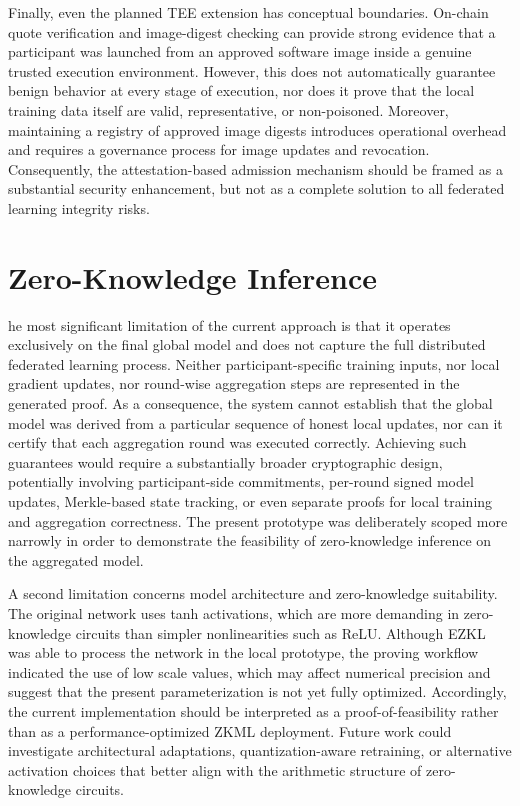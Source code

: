 Finally, even the planned TEE extension has conceptual boundaries. On-chain quote verification and image-digest checking can provide strong evidence that a participant was launched from an approved software image inside a genuine trusted execution environment. However, this does not automatically guarantee benign behavior at every stage of execution, nor does it prove that the local training data itself are valid, representative, or non-poisoned. Moreover, maintaining a registry of approved image digests introduces operational overhead and requires a governance process for image updates and revocation. Consequently, the attestation-based admission mechanism should be framed as a substantial security enhancement, but not as a complete solution to all federated learning integrity risks.

\section{Zero-Knowledge Inference}

he most significant limitation of the current approach is that it operates exclusively on the final global model and does not capture the full distributed federated learning process. Neither participant-specific training inputs, nor local gradient updates, nor round-wise aggregation steps are represented in the generated proof. As a consequence, the system cannot establish that the global model was derived from a particular sequence of honest local updates, nor can it certify that each aggregation round was executed correctly. Achieving such guarantees would require a substantially broader cryptographic design, potentially involving participant-side commitments, per-round signed model updates, Merkle-based state tracking, or even separate proofs for local training and aggregation correctness. The present prototype was deliberately scoped more narrowly in order to demonstrate the feasibility of zero-knowledge inference on the aggregated model.

A second limitation concerns model architecture and zero-knowledge suitability. The original network uses tanh activations, which are more demanding in zero-knowledge circuits than simpler nonlinearities such as ReLU. Although EZKL was able to process the network in the local prototype, the proving workflow indicated the use of low scale values, which may affect numerical precision and suggest that the present parameterization is not yet fully optimized. Accordingly, the current implementation should be interpreted as a proof-of-feasibility rather than as a performance-optimized ZKML deployment. Future work could investigate architectural adaptations, quantization-aware retraining, or alternative activation choices that better align with the arithmetic structure of zero-knowledge circuits.

